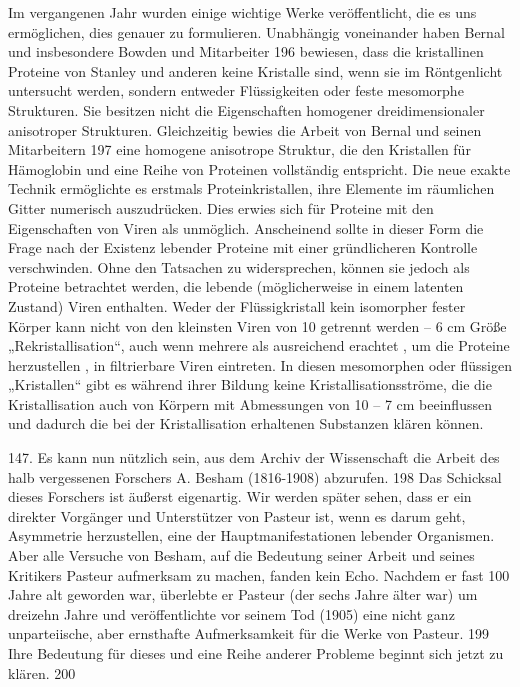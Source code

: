 \documentclass[11pt,a4paper]{book}
\begin{document}
Im vergangenen Jahr wurden einige wichtige Werke veröffentlicht, die es uns ermöglichen, dies genauer zu formulieren. Unabhängig voneinander haben Bernal und insbesondere Bowden und Mitarbeiter 196 bewiesen, dass die kristallinen Proteine von Stanley und anderen keine Kristalle sind, wenn sie im Röntgenlicht untersucht werden, sondern entweder Flüssigkeiten oder feste mesomorphe Strukturen. Sie besitzen nicht die Eigenschaften homogener dreidimensionaler anisotroper Strukturen. Gleichzeitig bewies die Arbeit von Bernal und seinen Mitarbeitern 197 eine homogene anisotrope Struktur, die den Kristallen für Hämoglobin und eine Reihe von Proteinen vollständig entspricht. Die neue exakte Technik ermöglichte es erstmals Proteinkristallen, ihre Elemente im räumlichen Gitter numerisch auszudrücken. Dies erwies sich für Proteine mit den Eigenschaften von Viren als unmöglich. Anscheinend sollte in dieser Form die Frage nach der Existenz lebender Proteine mit einer gründlicheren Kontrolle verschwinden. Ohne den Tatsachen zu widersprechen, können sie jedoch als Proteine betrachtet werden, die lebende (möglicherweise in einem latenten Zustand) Viren enthalten. Weder der Flüssigkristall kein isomorpher fester Körper kann nicht von den kleinsten Viren von 10 getrennt werden -- 6 cm Größe „Rekristallisation“, auch wenn mehrere als ausreichend erachtet , um die Proteine herzustellen , in filtrierbare Viren eintreten. In diesen mesomorphen oder flüssigen „Kristallen“ gibt es während ihrer Bildung keine Kristallisationsströme, die die Kristallisation auch von Körpern mit Abmessungen von 10 -- 7 cm beeinflussen und dadurch die bei der Kristallisation erhaltenen Substanzen klären können.



147. Es kann nun nützlich sein, aus dem Archiv der Wissenschaft die Arbeit des halb vergessenen Forschers A. Besham (1816-1908) abzurufen. 198 Das Schicksal dieses Forschers ist äußerst eigenartig. Wir werden später sehen, dass er ein direkter Vorgänger und Unterstützer von Pasteur ist, wenn es darum geht, Asymmetrie herzustellen, eine der Hauptmanifestationen lebender Organismen. Aber alle Versuche von Besham, auf die Bedeutung seiner Arbeit und seines Kritikers Pasteur aufmerksam zu machen, fanden kein Echo. Nachdem er fast 100 Jahre alt geworden war, überlebte er Pasteur (der sechs Jahre älter war) um dreizehn Jahre und veröffentlichte vor seinem Tod (1905) eine nicht ganz unparteiische, aber ernsthafte Aufmerksamkeit für die Werke von Pasteur. 199 Ihre Bedeutung für dieses und eine Reihe anderer Probleme beginnt sich jetzt zu klären. 200
\end{document}
